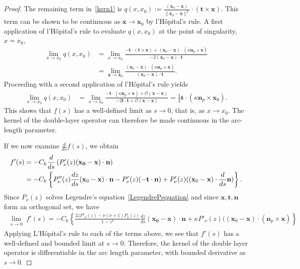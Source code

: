 \begin{proof}
The remaining term in~\eqref{kern1} is $q(x,x_0) :=
\frac{(\mathbf{x}_{0}-\mathbf{x})}{\|\mathbf{x}_{0}-\mathbf{x}\|^2}
\cdot \left( \mathbf{t} \times \mathbf{x} \right).$  This term can be
shown to be continuous as $\mathbf{x} \rightarrow \mathbf{x}_{0}$ by
l'H\^{o}pital's rule.  A first application of l'H\^{o}pital's rule to
evaluate $q(x,x_0)$ at the point of singularity, $x = x_{0}$, 
\begin{align*}
  \lim_{x \rightarrow x_{0}}q(x,x_{0}) & = 
  \lim_{x \rightarrow x_{0}} 
  \frac{ -\mathbf{t} \cdot \left(\mathbf{t} \times \mathbf{x} \right)
  + (\mathbf{x}_{0}-\mathbf{x}) \cdot \left( \kappa \mathbf{n}_{p}
  \times \mathbf{x} \right)}
  {-2(\mathbf{x}_{0} - \mathbf{x}) \cdot \mathbf{t}} \\
  & = \lim_{\mathbf{x} \rightarrow \mathbf{x}_{0}} 
  \frac{(\mathbf{x}_{0}-\mathbf{x}) \cdot \left(
  \kappa\mathbf{n}_{p} \times \mathbf{x}\right)}
  {(\mathbf{x}_{0} - \mathbf{x}) \cdot \mathbf{t}}. 
\end{align*}
Proceeding with a second application of l'H\^{o}pital's rule yields
\begin{align*}
  \lim_{x \rightarrow x_{0}} q(x,x_0)  
  & = \lim_{x \rightarrow x_{0}} \frac{-\mathbf{t} \cdot 
  \left( \kappa \mathbf{n}_{p} \times \mathbf{x} \right) +
  \mathcal{O}(\mathbf{x}-\mathbf{x})}
  {-2\mathbf{t} \cdot \mathbf{t} + \mathcal{O}(\mathbf{x}-\mathbf{x})}
  = \frac{1}{2} \mathbf{t} \cdot \left( \kappa \mathbf{n}_{p} \times 
  \mathbf{x}_{0} \right).
\end{align*}
This shows that $f(s)$ has a well-defined limit as $s\rightarrow 0$,
that is, as $x \rightarrow x_0$. The kernel of the double-layer
operator can therefore be made continuous in the arc-length parameter.

If we now examine $\frac{d}{ds}f(s)$, we obtain
\begin{align*} 
  f'(s)&= -C_k \frac{d}{ds}\left( P'_\nu(z)(\mathbf{x_0}-\mathbf{x}) \cdot 
    \mathbf{n} \right) \\
  &=-C_{k} \left\{P''_{\nu}(z) \frac{dz}{ds}
    (\mathbf{x}_{0}-\mathbf{x})  \cdot \mathbf{n} - P'_{\nu}(z)
    (-\mathbf{t} \cdot \mathbf{n}) + P'_\nu(z)((\mathbf{x}_{0} -
    \mathbf{x}) \cdot \frac{d}{ds}\mathbf{n})\right\}.
 \end{align*}
Since $P_\nu(z)$ solves Legendre's equation~\eqref{LegendrePequation}
and since $\mathbf{x},\mathbf{t}, \mathbf{n}$ form an orthogonal set,
we have
\begin{align*}
  \lim_{\substack {s \rightarrow 0}} f'(s) =-C_k
  \left\{\frac{2zP'_{\nu}(z)-\nu(\nu+1)P_{\nu}(z)}{1-z^2}
  \frac{dz}{ds}(\mathbf{x_0}-\mathbf{x})\cdot \mathbf{n} + \kappa
  P'_\nu(z)((\mathbf{x}_{0}-\mathbf{x})\cdot (\mathbf{n}_{p} \times 
  \mathbf{x})\right\}
\end{align*}
Applying L'H\^{o}pital's rule to each of the terms above, we see that
$f'(s)$ has a well-defined and bounded limit at $s \rightarrow 0$.
Therefore, the kernel of the double layer operator is differentiable in
the arc length parameter, with bounded derivative as $s \rightarrow 0$. 


\end{proof}
